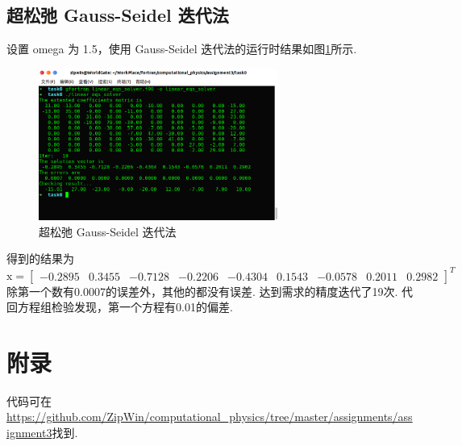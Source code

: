 \documentclass{article}
\begin{document}
	\subsection{超松弛 Gauss-Seidel 迭代法}
	设置 omega 为 1.5，使用 Gauss-Seidel 迭代法的运行时结果如图\ref{fig:rtr_overgs}所示.
	\begin{figure}[h!tb]
		\centering
		\includegraphics[width=0.7\textwidth]{./utils/rtr_overgs.png}
		\caption{超松弛 Gauss-Seidel 迭代法\label{fig:rtr_overgs}}
	\end{figure}
	得到的结果为
	\[
	\mathrm{x}=
	\begin{bmatrix}
	-0.2895 & 0.3455 & -0.7128 & -0.2206 & -0.4304 & 0.1543 & -0.0578 & 0.2011 & 0.2982
	\end{bmatrix}^T
	\]
	除第一个数有0.0007的误差外，其他的都没有误差. 达到需求的精度迭代了19次. 代回方程组检验发现，第一个方程有0.01的偏差.
	
	\section*{附录}
	代码可在\url{https://github.com/ZipWin/computational_physics/tree/master/assignments/assignment3}找到.
	
	
	
\end{document}
